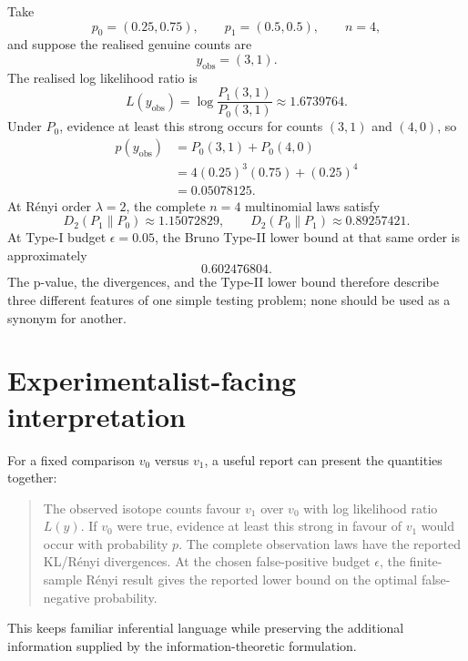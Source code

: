 \documentclass[11pt]{article}
\begin{document}
Take
\begin{equation}
p_0=(0.25,0.75),
\qquad
p_1=(0.5,0.5),
\qquad
n=4,
\end{equation}
and suppose the realised genuine counts are
\begin{equation}
y_{\mathrm{obs}}=(3,1).
\end{equation}
The realised log likelihood ratio is
\begin{equation}
L(y_{\mathrm{obs}})
=\log\frac{P_1(3,1)}{P_0(3,1)}
\approx 1.6739764.
\end{equation}
Under $P_0$, evidence at least this strong occurs for counts $(3,1)$ and $(4,0)$,
so
\begin{align}
p(y_{\mathrm{obs}})
&=P_0(3,1)+P_0(4,0)\\
&=4(0.25)^3(0.75)+(0.25)^4\\
&=0.05078125.
\end{align}
At Rényi order $\lambda=2$, the complete $n=4$ multinomial laws satisfy
\begin{equation}
D_2(P_1\|P_0)\approx1.15072829,
\qquad
D_2(P_0\|P_1)\approx0.89257421.
\end{equation}
At Type-I budget $\epsilon=0.05$, the Bruno Type-II lower bound at that same
order is approximately
\begin{equation}
0.602476804.
\end{equation}
The p-value, the divergences, and the Type-II lower bound therefore describe
three different features of one simple testing problem; none should be used as
a synonym for another.

\section{Experimentalist-facing interpretation}

For a fixed comparison $v_0$ versus $v_1$, a useful report can present the
quantities together:

\begin{quote}
The observed isotope counts favour $v_1$ over $v_0$ with log likelihood ratio
$L(y)$. If $v_0$ were true, evidence at least this strong in favour of $v_1$
would occur with probability $p$. The complete observation laws have the
reported KL/Rényi divergences. At the chosen false-positive budget $\epsilon$,
the finite-sample Rényi result gives the reported lower bound on the optimal
false-negative probability.
\end{quote}

This keeps familiar inferential language while preserving the additional
information supplied by the information-theoretic formulation.
\end{document}
